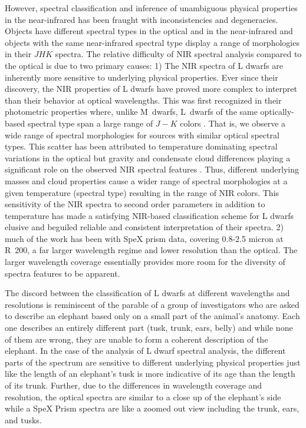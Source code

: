 \documentclass[12pt,preprint]{aastex}
\begin{document}
However, spectral classification and inference of unambiguous physical properties in the near-infrared has been fraught with inconsistencies and degeneracies. 
Objects have different spectral types in the optical and in the near-infrared and objects with the same near-infrared spectral type display a range of morphologies in their $JHK$ spectra. 
The relative difficulty of NIR spectral analysis compared to the optical is due to two primary causes:
1) The NIR spectra of L dwarfs are inherently more sensitive to underlying physical properties.
Ever since their discovery, the NIR properties of L dwarfs have proved more complex to interpret than their behavior at optical wavelengths. 
This was first recognized in their photometric properties where, unlike M~dwarfs, L~dwarfs of the same optically-based spectral type span a large range of $J-K$ colors \citep[e.g.,]{Leggett:2003tm}. 
That is, we observe a wide range of spectral morphologies for sources with similar optical spectral types.
This scatter has been attributed to temperature dominating spectral variations in the optical but gravity and condensate cloud differences playing a significant role on the observed NIR spectral features \citep{Knapp04}.
Thus, different underlying masses and cloud properties cause a wider range of spectral morphologies at a given temperature (spectral type) resulting in the range of NIR colors. 
This sensitivity of the NIR spectra to second order parameters in addition to temperature has made a satisfying NIR-based classification scheme for L dwarfs elusive and beguiled reliable and consistent interpretation of their spectra.
2) much of the work has been with SpeX prism data, covering 0.8-2.5 micron at R~200, a far larger wavelength regime and lower resolution than the optical.
The larger wavelength coverage essentially provides more room for the diversity of spectra features to be apparent. 

The discord between the classification of L dwarfs at different wavelengths and resolutions is reminiscent of the parable of a group of investigators who are asked to describe an elephant based only on a small part of the animal's anatomy. 
Each one describes an entirely different part (tusk, trunk, ears, belly) and while none of them are wrong, they are unable to form a coherent description of the elephant.
In the case of the analysis of L dwarf spectral analysis, the different parts of the spectrum are sensitive to different underlying physical properties just like the length of an elephant's tusk is more indicative of its age than the length of its trunk. 
Further, due to the differences in wavelength coverage and resolution, the optical spectra are similar to a close up of the elephant's side while a SpeX Prism spectra are like a zoomed out view including the trunk, ears, and tusks. 
\end{document}
